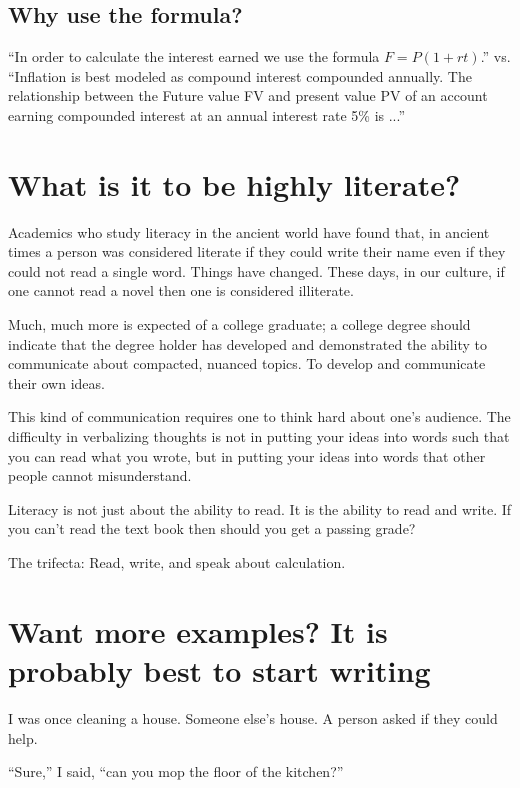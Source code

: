 \documentclass[12pt]{article}
\begin{document}
\subsection{Why use the formula?}
``In order to calculate the interest earned we use the formula $F=P(1+rt)$.''
vs.\\
``Inflation is best modeled as compound interest compounded annually. The relationship between the Future value FV and present value PV of an account earning compounded interest at an annual interest rate  5\% is ...'' 

\section*{What is it to be highly literate?}
Academics who study literacy in the ancient world have found that, in ancient times a person was considered literate if they could write their name even if they could not read a single word. Things have changed. These days, in our culture, if one cannot read a novel then one is considered illiterate. 

Much, much more is expected of a college graduate;  a college degree should indicate that the degree holder has developed and demonstrated the ability to communicate about compacted, nuanced topics. To develop and communicate their own ideas. 

This kind of communication requires one to think hard about one's audience. The difficulty in verbalizing thoughts is not in putting your ideas into words such that you can read what you wrote, but in putting your ideas into words that other people cannot misunderstand. 

Literacy is not just about the ability to read. It is the ability to read and write. If you can't read the text book then should you get a passing grade? 


The trifecta: Read, write, and speak about calculation.


\section{Want more examples? It is probably best to start writing}
I was once cleaning a house. Someone else's house. A person asked if they could help. 

``Sure,'' I said, ``can you mop the floor of the kitchen?'' 
\end{document}
